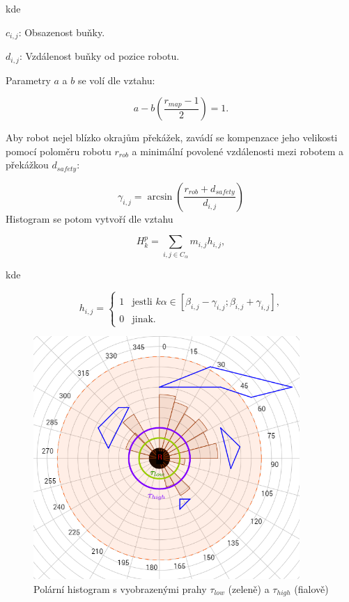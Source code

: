 \documentclass[twoside]{ctuthesis}
\theoremstyle{plain}
\theoremstyle{definition}
\theoremstyle{note}
\begin{document}
kde

$c_{i,j}$: Obsazenost buňky.

$d_{i,j}$: Vzdálenost buňky od pozice robotu.

Parametry $a$ a $b$ se volí dle vztahu:

\begin{equation}
a - b\left(\frac{r_{map} - 1}{2}\right)   = 1.
\end{equation}


Aby robot nejel blízko okrajům překážek, zavádí se kompenzace jeho velikosti pomocí poloměru robotu $r_{rob}$ a minimální povolené vzdálenosti mezi robotem a překážkou $d_{safety}$:

$$\gamma_{i,j} = \arcsin\left(\frac{r_{rob} + d_{safety}}{d_{i,j}}\right)$$
Histogram se potom vytvoří dle vztahu 

\begin{equation}
H_k^p = \sum_{i,j \in C_{\alpha} } m_{i,j}h_{i,j},
\end{equation}

kde

$$h_{i,j} = \left\{
\begin{array}{ll} 
1&\textrm{jestli $k\alpha \in \left[\beta_{i,j} - \gamma_{i,j}; \beta_{i,j} + \gamma_{i,j}\right]$,} \\ 
0&\textrm{jinak.}
\end{array} 
\right.
$$


\begin{figure}
	\caption{Polární histogram s vyobrazenými prahy $\tau_{low}$ (zeleně) a $\tau_{high}$ (fialově)}
	
	\label{polar}
	\includegraphics[width=0.9\textwidth]{images/3/polar.png}
\end{figure}
\end{document}
